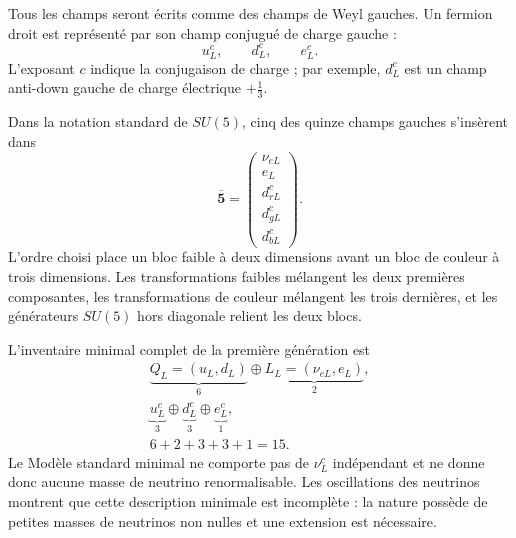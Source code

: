 Tous les champs seront écrits comme des champs de Weyl gauches. Un fermion droit est représenté par son champ conjugué de charge gauche :
\begin{equation}
u^c_L,\qquad d^c_L,\qquad e^c_L.
\label{eq:l10-left-handed-bookkeeping}
\end{equation}
L’exposant \(c\) indique la conjugaison de charge ; par exemple, \(d^c_L\) est un champ anti-down gauche de charge électrique \(+\tfrac13\).

Dans la notation standard de \(SU(5)\), cinq des quinze champs gauches s’insèrent dans
\begin{equation}
\overline{\mathbf5}
=
\begin{pmatrix}
\nu_{eL}\\
e_L\\
d^c_{rL}\\
d^c_{gL}\\
d^c_{bL}
\end{pmatrix}.
\label{eq:l10-fivebar}
\end{equation}
L’ordre choisi place un bloc faible à deux dimensions avant un bloc de couleur à trois dimensions. Les transformations faibles mélangent les deux premières composantes, les transformations de couleur mélangent les trois dernières, et les générateurs \(SU(5)\) hors diagonale relient les deux blocs.


L’inventaire minimal complet de la première génération est
\begin{equation}
\begin{gathered}
\underbrace{Q_L=(u_L,d_L)}_{6}
\oplus
\underbrace{L_L=(\nu_{eL},e_L)}_{2},\\
\underbrace{u^c_L}_{3}
\oplus
\underbrace{d^c_L}_{3}
\oplus
\underbrace{e^c_L}_{1},\\
6+2+3+3+1=15.
\end{gathered}
\label{eq:l10-fifteen}
\end{equation}
Le Modèle standard minimal ne comporte pas de \(\nu^c_L\) indépendant et ne donne donc aucune masse de neutrino renormalisable. Les oscillations des neutrinos montrent que cette description minimale est incomplète : la nature possède de petites masses de neutrinos non nulles et une extension est nécessaire.

